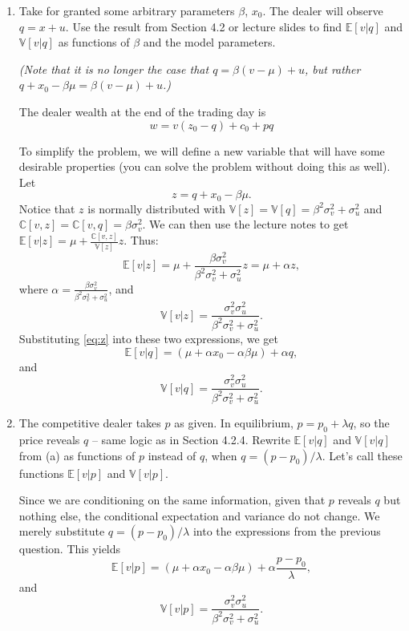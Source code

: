 \documentclass[11pt
, answers
]{exam}
\begin{document}
\begin{enumerate}[label=(\alph*). ]
\item Take for granted some arbitrary parameters $\beta$, $x_{0}$. The dealer will observe $q=x+u$. 
Use the result from Section 4.2 or lecture slides to find $\mathbb{E}[v|q]$ and $\mathbb{V}[v|q]$ as functions of $\beta$ and the model parameters.

\emph{(Note that it is no longer the case that $q = \beta(v-\mu)+u$, but rather $q+x_{0}-\beta \mu = \beta(v-\mu)+u$.)}

\begin{solution}
The dealer wealth at the end of the trading day is
\[
w = v(z_{0}-q) + c_{0} + pq
\]

To simplify the problem, we will define a new variable that will have some desirable properties (you can solve the problem without doing this as well). Let 
\begin{equation} \label{eq:z}
z=q+x_{0}-\beta \mu.
\end{equation}
 Notice that $z$ is normally distributed with $\mathbb{V}[z]=\mathbb{V}[q]=\beta^{2}\sigma^{2}_{v}+\sigma^{2}_{u}$ and $\mathbb{C}[v,z]=\mathbb{C}[v,q]=\beta \sigma^{2}_{v}$. We can then use the lecture notes to get $\mathbb{E}[v|z]=\mu+\frac{\mathbb{C}[v,z]}{\mathbb{V}[z]}z$. Thus:
\[
\mathbb{E}[v|z] = \mu+\frac{\beta \sigma^{2}_{v}}{\beta^{2}\sigma^{2}_{v}+\sigma^{2}_{u}} z =\mu + \alpha z,
\]
where $\alpha = \frac{\beta \sigma^{2}_{v}}{\beta^{2}\sigma^{2}_{v}+\sigma^{2}_{u}}$, and
\[
\mathbb{V}[v|z]=\frac{\sigma^{2}_{v}\sigma_{u}^{2}}{\beta^{2}\sigma^{2}_{v}+\sigma^{2}_{u}}.
\]
Substituting \eqref{eq:z} into these two expressions, we get 
\[
\mathbb{E}[v|q] = (\mu + \alpha x_{0} - \alpha \beta \mu)  + \alpha q,
\]
and 
\[
\mathbb{V}[v|q]=\frac{\sigma^{2}_{v}\sigma_{u}^{2}}{\beta^{2}\sigma^{2}_{v}+\sigma^{2}_{u}}.
\]
\end{solution}


\item The competitive dealer takes $p$ as given. In equilibrium, $p=p_{0}+\lambda q$, so the price reveals $q$ -- same logic as in Section 4.2.4. Rewrite $\mathbb{E}[v|q]$ and $\mathbb{V}[v|q]$ from (a) as functions of $p$ instead of $q$, when $q=(p-p_{0})/\lambda$. Let's call these functions $\mathbb{E}[v|p]$ and $\mathbb{V}[v|p]$.

\begin{solution}
Since we are conditioning on the same information, given that $p$ reveals $q$ but nothing else, the conditional expectation and variance do not change. We merely substitute $q=(p-p_{0})/\lambda$ into the expressions from the previous question. This yields
\[
\mathbb{E}[v|p] =  (\mu + \alpha x_{0} - \alpha \beta \mu) +\alpha \frac{p-p_{0}}{\lambda},
\]
and
\[
\mathbb{V}[v|p]=\frac{\sigma^{2}_{v}\sigma_{u}^{2}}{\beta^{2}\sigma^{2}_{v}+\sigma^{2}_{u}}.
\]
\end{solution}


\end{enumerate}
\end{document}
